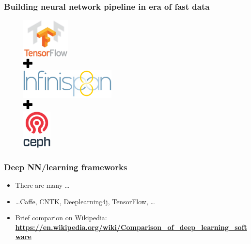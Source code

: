 \documentclass[10pt,utf8]{beamer}
\begin{document}
\begin{frame}
	\frametitle{Building neural network pipeline in era of fast data}
	\begin{figure}
		\centering
		 {
			\includegraphics[height=2cm]{./img/tensorflow_logo.eps}\\
		}
		\visible<3,4> {
			\includegraphics[height=0.5cm]{./img/plus.eps}\\
			\includegraphics[height=1.5cm]{./img/infinispan8_logo.eps}\\
		}
		\visible<4> {
			\includegraphics[height=0.5cm]{./img/plus.eps}\\
			\includegraphics[height=2cm]{./img/ceph_logo.eps}
		}
	\end{figure}
\end{frame}

\begin{frame}
	\frametitle{Deep NN/learning frameworks}
	\begin{itemize}
		\item There are many \dots \pause
		\item \dots Caffe, CNTK, Deeplearning4j, TensorFlow, \dots \pause
		\item Brief comparion on Wikipedia: \\ \textbf{\footnotesize{\color{blue} \url{https://en.wikipedia.org/wiki/Comparison_of_deep_learning_software}}}
	\end{itemize}
\end{frame}
\end{document}
